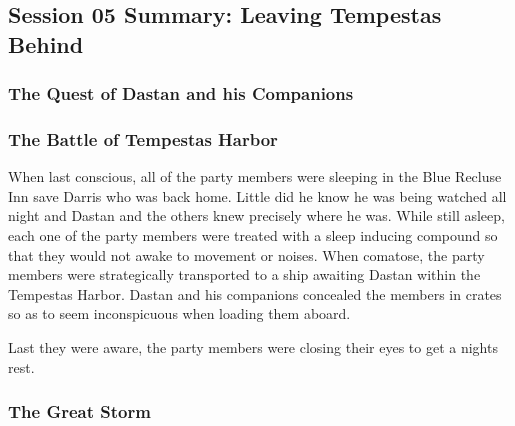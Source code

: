 \subsection{Session 05 Summary: Leaving Tempestas Behind}

\subsubsection{The Quest of Dastan and his Companions}

\subsubsection{The Battle of Tempestas Harbor}

When last conscious, all of the party members were sleeping in the Blue Recluse Inn save Darris who was back home. Little did he know he was being watched all night and Dastan and the others knew precisely where he was. While still asleep, each one of the party members were treated with a sleep inducing compound so that they would not awake to movement or noises. When comatose, the party members were strategically transported to a ship awaiting Dastan within the Tempestas Harbor. Dastan and his companions concealed the members in crates so as to seem inconspicuous when loading them aboard.

Last they were aware, the party members were closing their eyes to get a nights rest. 

\subsubsection{The Great Storm}